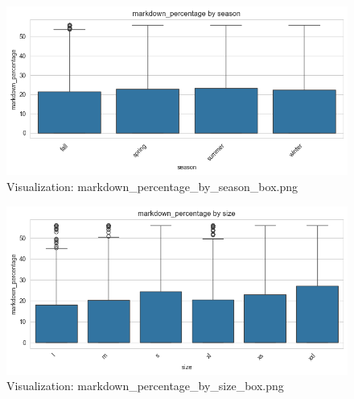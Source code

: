 \documentclass{article}%
\begin{document}
\begin{minipage}[c]{0.48\textwidth}%


\begin{figure}[H]%
\centering%
\includegraphics[width=\linewidth]{output/plots/markdown_percentage_by_season_box.png}%
\caption{Visualization: markdown\_percentage\_by\_season\_box.png}%
\end{figure}

%
\end{minipage}%
\begin{minipage}[c]{0.48\textwidth}%


\begin{figure}[H]%
\centering%
\includegraphics[width=\linewidth]{output/plots/markdown_percentage_by_size_box.png}%
\caption{Visualization: markdown\_percentage\_by\_size\_box.png}%
\end{figure}

%
\end{minipage}%
\vspace{10pt}%
\\%
\end{document}
